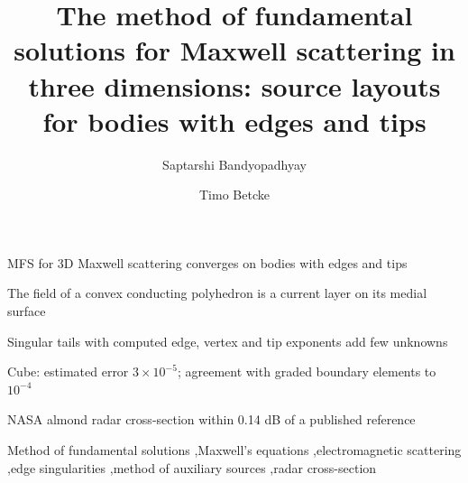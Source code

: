 \documentclass[final,3p,times]{elsarticle}
\begin{document}
\begin{frontmatter}

\title{The method of fundamental solutions for Maxwell scattering in three dimensions: source layouts for bodies with edges and tips}

\author[inst1]{Saptarshi Bandyopadhyay}

\author[inst1]{Timo Betcke}


\begin{abstract}

\end{abstract}

\begin{highlights}
\item MFS for 3D Maxwell scattering converges on bodies with edges and tips
\item The field of a convex conducting polyhedron is a current layer on its medial surface
\item Singular tails with computed edge, vertex and tip exponents add few unknowns
\item Cube: estimated error $3\times10^{-5}$; agreement with graded boundary elements to $10^{-4}$
\item NASA almond radar cross-section within 0.14 dB of a published reference
\end{highlights}

\begin{keyword}
Method of fundamental solutions \sep Maxwell's equations \sep electromagnetic scattering \sep edge singularities \sep method of auxiliary sources \sep radar cross-section
\end{keyword}

\end{frontmatter}









\end{document}
